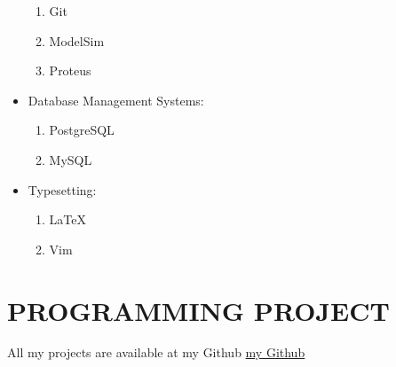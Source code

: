 \documentclass{res}
\begin{document}
\begin{resume}
\begin{itemize}
\begin{enumerate}
				\item{Git}
				\item{ModelSim}
				\item{Proteus}
			\end{enumerate}
		\item{Database Management Systems:}
			\begin{enumerate}
				\item{PostgreSQL}
				\item{MySQL}
			\end{enumerate}
		\item{Typesetting:}
			\begin{enumerate}
				\item{\LaTeX}
				\item{Vim}
			\end{enumerate}
	\end{itemize}
	\section{PROGRAMMING PROJECT}
	All my projects are available at my Github \href{https://www.github.com/1995parham}{my Github}

\end{resume}
\end{document}
